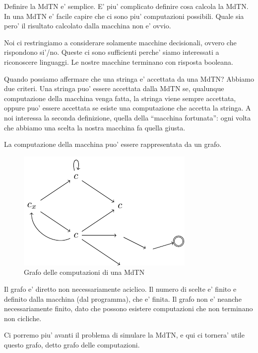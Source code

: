 Definire la MdTN e' semplice. E' piu' complicato definire cosa calcola la MdTN. In una MdTN e'
facile capire che ci sono piu' computazioni possibili. Quale sia pero' il risultato calcolato dalla
macchina non e' ovvio.

Noi ci restringiamo a considerare solamente macchine decisionali, ovvero che rispondono si'/no.
Queste ci sono sufficienti perche' siamo interessati a riconoscere linguaggi. Le nostre macchine
terminano con risposta booleana.

Quando possiamo affermare che una stringa e' accettata da una MdTN? Abbiamo due criteri. Una stringa
puo' essere accettata dalla MdTN se, qualunque computazione della macchina venga fatta, la stringa
viene sempre accettata, oppure puo' essere accettata se esiste una computazione che accetta la
stringa. A noi interessa la seconda definizione, quella della ``macchina fortunata'': ogni volta che
abbiamo una scelta la nostra macchina fa quella giusta.


La computazione della macchina puo' essere rappresentata da un grafo.

\begin{figure}[h]
    \begin{center}
        \includegraphics{./img/nondeterminism/MdTN.pdf}
        \caption{Grafo delle computazioni di una MdTN}
    \end{center}
\end{figure}

Il grafo e' diretto non necessariamente aciclico. Il numero di scelte e' finito e definito dalla
macchina (dal programma), che e' finita. Il grafo non e' neanche necessariamente finito, dato che
possono esistere computazioni che non terminano non cicliche.

Ci porremo piu' avanti il problema di simulare la MdTN, e qui ci tornera' utile questo grafo, detto
grafo delle computazioni.

